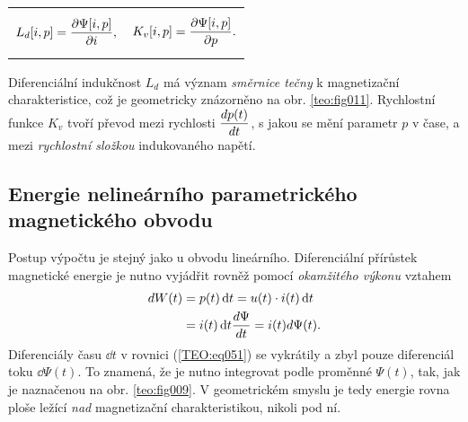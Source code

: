 {      \noindent\begin{tabularx}{\linewidth}{@{}XX@{}}
        \begin{equation}\label{TEO:eq049}
           L_d[i,p]=\dfrac{\partial \Psi[i, p]}{\partial i},
        \end{equation} & 
        \begin{equation}\label{TEO:eq050}
           K_v[i,p] = \dfrac{\partial \Psi[i, p]}{\partial p}.
        \end{equation} 
      \end{tabularx}
      
      Diferenciální indukčnost \(L_d\) má význam \emph{směrnice tečny} k magnetizační 
      charakteristice, což je geometricky znázorněno na obr. \ref{teo:fig011}. Rychlostní funkce 
      \(K_v\) tvoří převod mezi rychlosti \(\dfrac{d p(t)}{d t}\), s jakou se mění parametr \(p\) v 
      čase, a mezi \emph{rychlostní složkou} indukovaného napětí.

        
      
    \subsection{Energie nelineárního parametrického magnetického obvodu}
     Postup výpočtu je stejný jako u obvodu lineárního. Diferenciální přírůstek magnetické energie 
     je nutno vyjádřit rovněž pomocí \emph{okamžitého výkonu} vztahem
      \begin{align}\label{TEO:eq051}
        dW(t) &= p(t)\mathop{}\!\mathrm{d}t = u(t)\cdot i(t)\mathop{}\!\mathrm{d}t     \nonumber \\
              &= i(t)\mathop{}\!\mathrm{d}t\dfrac{d \Psi}{d t} = i(t)d\Psi(t).
      \end{align}
      Diferenciály času \(\dd{t}\) v rovnici (\ref{TEO:eq051}) se vykrátily a zbyl pouze 
      diferenciál toku \(\dd{\Psi(t)}\). To znamená, že je nutno integrovat podle proměnné 
      \(\Psi(t)\), tak, jak je naznačenou na obr. \ref{teo:fig009}. V geometrickém smyslu je tedy 
      energie rovna ploše ležící \emph{nad} magnetizační charakteristikou, nikoli pod ní.
      
}
